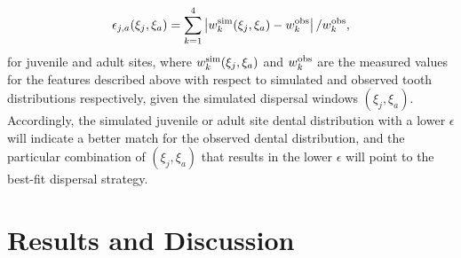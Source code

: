 \documentclass[]{rsos}%
\begin{document}
\begin{equation}
\epsilon_{j,a}(\xi_j,\xi_a) = \sum_{k=1}^4 \left| w^{\rm sim}_k(\xi_j,\xi_a) - w^{\rm obs}_k \right|/w^{\rm obs}_k,
\label{eq:error}
\end{equation}
for juvenile and adult sites, where $w^{\rm sim}_k(\xi_j,\xi_a)$ and $w^{\rm obs}_k$ are the measured values for the features described above with respect to simulated and observed tooth distributions respectively, given the simulated dispersal windows $(\xi_j,\xi_a)$.
Accordingly, the simulated juvenile or adult site dental distribution with a lower $\epsilon$ will indicate a better match for the observed dental distribution, and the particular combination of $(\xi_j,\xi_a)$ that results in the lower $\epsilon$ will point to the best-fit dispersal strategy.









\section{Results and Discussion}
\end{document}
